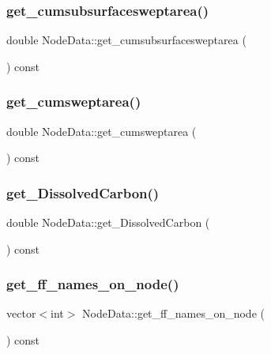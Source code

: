 \subsubsection{\texorpdfstring{get\_cumsubsurfacesweptarea()}{get\_cumsubsurfacesweptarea()}}
{\footnotesize\ttfamily double Node\+Data\+::get\+\_\+cumsubsurfacesweptarea (\begin{DoxyParamCaption}{ }\end{DoxyParamCaption}) const\hspace{0.3cm}{\ttfamily [inline]}}

\mbox{\label{class_node_data_ae92845c304b2b48e91bd85d2783254bf}} 
\subsubsection{\texorpdfstring{get\_cumsweptarea()}{get\_cumsweptarea()}}
{\footnotesize\ttfamily double Node\+Data\+::get\+\_\+cumsweptarea (\begin{DoxyParamCaption}{ }\end{DoxyParamCaption}) const\hspace{0.3cm}{\ttfamily [inline]}}

\mbox{\label{class_node_data_a09704839d81a8a5f1b2ac63484708e27}} 
\subsubsection{\texorpdfstring{get\_DissolvedCarbon()}{get\_DissolvedCarbon()}}
{\footnotesize\ttfamily double Node\+Data\+::get\+\_\+\+Dissolved\+Carbon (\begin{DoxyParamCaption}{ }\end{DoxyParamCaption}) const\hspace{0.3cm}{\ttfamily [inline]}}

\mbox{\label{class_node_data_a2e9b8cef08c76eea064d9be28b89494b}} 
\subsubsection{\texorpdfstring{get\_ff\_names\_on\_node()}{get\_ff\_names\_on\_node()}}
{\footnotesize\ttfamily vector$<$int$>$ Node\+Data\+::get\+\_\+ff\+\_\+names\+\_\+on\+\_\+node (\begin{DoxyParamCaption}{ }\end{DoxyParamCaption}) const\hspace{0.3cm}{\ttfamily [inline]}}

